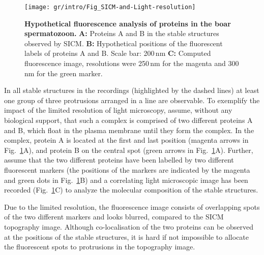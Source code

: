 \begin{figure}
  \sidecaption
  \texttt{[image: gr/intro/Fig\_SICM-and-Light-resolution]}%
  \caption{\textbf{Hypothetical fluorescence analysis of proteins in the boar
      spermatozoon.} \textbf{A:} Proteins A and B in the stable structures
    observed by SICM. \textbf{B:} Hypothetical positions of the fluorescent
    labels of proteins A and B. Scale bar: 200\,nm \textbf{C:} Computed
    fluorescence image, resolutions were 250\,nm for the magenta and 300\,nm
    for the green marker.}
  \label{fig:sicm-and-light-resolution}
\end{figure}
In all stable structures in the recordings (highlighted by the dashed lines)
at least one group of three protrusions arranged in a line are observable. To
exemplify the impact of the limited resolution of light microscopy, assume,
without any biological support, that such a complex is comprised of two
different proteins A and B, which float in the plasma membrane until they form
the complex. In the complex, protein A is located at the first and last
position (magenta arrows in Fig.~\ref{fig:sicm-and-light-resolution}A), and
protein B on the central spot (green arrows in
Fig.~\ref{fig:sicm-and-light-resolution}A). Further, assume that the two
different proteins have been labelled by two different fluorescent markers
(the positions of the markers are indicated by the magenta and green dots in
Fig.~\ref{fig:sicm-and-light-resolution}B) and a correlating light microscopic
image has been recorded (Fig.~\ref{fig:sicm-and-light-resolution}C) to analyze
the molecular composition of the stable structures.

Due to the limited resolution, the fluorescence image consists of overlapping
spots of the two different markers and looks blurred, compared to the
SICM topography image. Although co-localisation of the two proteins can be
observed at the positions of the stable structures, it is hard if not
impossible to allocate the fluorescent spots to protrusions in the topography
image.


